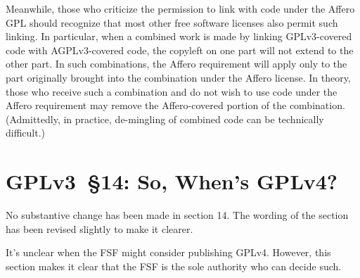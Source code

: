 

Meanwhile, those who criticize the permission to link with code under the Affero
GPL should recognize that most other free software licenses also permit
such linking.  In particular, when a combined work is made by linking GPLv3-covered code
with AGPLv3-covered code, the copyleft on one part will not extend to the
other part. In such combinations, the Affero requirement will apply only to
the part originally brought into the combination under the Affero license.
In theory, those who receive such a combination and do not wish to use code
under the Affero requirement may remove the Affero-covered portion of the
combination.  (Admittedly, in practice, de-mingling of combined code can be
technically difficult.)


\section{GPLv3~\S14: So, When's GPLv4?}
\label{GPLv3s14}

No substantive change has been made in section 14. The wording of the section
has been revised slightly to make it clearer.

It's unclear when the FSF might consider publishing GPLv4.  However, this
section makes it clear that the FSF is the sole authority who can decide
such.


